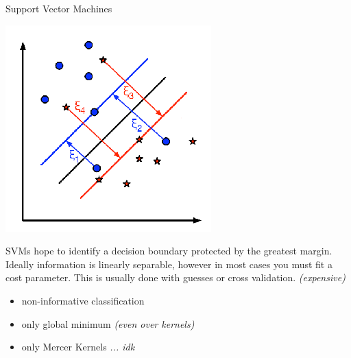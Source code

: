 \documentclass[10pt]{beamer}
\begin{document}
\begin{frame}{Support Vector Machines}

  \begin{multicols}{2}
    \includegraphics[width=\columnwidth]{./svm_basics3.png}
    \columnbreak

    SVMs hope to identify a decision boundary protected by the
    greatest margin. Ideally information is linearly separable, however
    in most cases you must fit a cost parameter. This is usually done
    with guesses or cross validation. {\em (expensive)}
  \end{multicols}

  \begin{itemize}
  \item non-informative classification
  \item only global minimum {\em (even over kernels)}
  \item only Mercer Kernels {\em ... idk}
  \end{itemize}

\end{frame}
\end{document}
